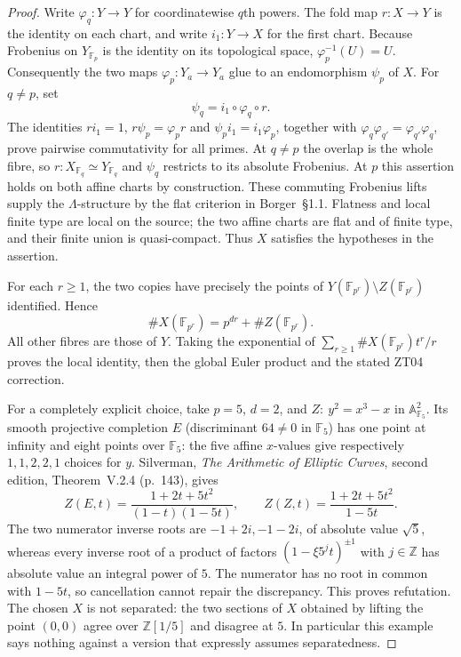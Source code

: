 \begin{proof}
Write $\varphi_q:Y\to Y$ for coordinatewise $q$th powers.  The fold map
$r:X\to Y$ is the identity on each chart, and write $i_1:Y\to X$ for the
first chart.  Because Frobenius on $Y_{\mathbb F_p}$ is the identity on
its topological space, $\varphi_p^{-1}(U)=U$.  Consequently the two
maps $\varphi_p:Y_a\to Y_a$ glue to an endomorphism $\psi_p$ of $X$.
For $q\ne p$, set
\[
 \psi_q=i_1\circ\varphi_q\circ r.
\]
The identities $r i_1=1$, $r\psi_p=\varphi_p r$ and
$\psi_p i_1=i_1\varphi_p$, together with
$\varphi_q\varphi_{q'}=\varphi_{q'}\varphi_q$, prove pairwise
commutativity for all primes.  At $q\ne p$ the overlap is the whole
fibre, so $r:X_{\mathbb F_q}\simeq Y_{\mathbb F_q}$ and $\psi_q$
restricts to its absolute Frobenius.  At $p$ this assertion holds on
both affine charts by construction.  These commuting Frobenius lifts
supply the $\Lambda$-structure by the flat criterion in Borger~\S1.1.
Flatness and local finite type are local on the source; the two affine
charts are flat and of finite type, and their finite union is
quasi-compact.  Thus $X$ satisfies the hypotheses in the assertion.

For each $r\geq1$, the two copies have precisely the points of
$Y(\mathbb F_{p^r})\setminus Z(\mathbb F_{p^r})$ identified.  Hence
\[
 \#X(\mathbb F_{p^r})=p^{dr}+\#Z(\mathbb F_{p^r}).
\]
All other fibres are those of $Y$.  Taking the exponential of
$\sum_{r\geq1}\#X(\mathbb F_{p^r})t^r/r$ proves the local identity,
then the global Euler product and the stated ZT04 correction.

For a completely explicit choice, take $p=5$, $d=2$, and
$Z:\ y^2=x^3-x$ in $\mathbb A^2_{\mathbb F_5}$.  Its smooth projective
completion $E$ (discriminant $64\ne0$ in $\mathbb F_5$) has one
point at infinity and eight points over $\mathbb F_5$: the five affine $x$-values give respectively
$1,1,2,2,1$ choices for $y$.  Silverman, \emph{The Arithmetic of Elliptic Curves}, second edition,
Theorem~V.2.4 (p.~143), gives
\[
 Z(E,t)=\frac{1+2t+5t^2}{(1-t)(1-5t)},\qquad
 Z(Z,t)=\frac{1+2t+5t^2}{1-5t}.
\]
The two numerator inverse roots are $-1+2i,-1-2i$, of absolute value
$\sqrt5$, whereas every inverse root of a product of factors
$(1-\xi5^jt)^{\pm1}$ with $j\in\mathbb Z$ has absolute value an
integral power of $5$.  The numerator has no root in common with
$1-5t$, so cancellation cannot repair the discrepancy.  This proves
refutation.  The chosen $X$ is not separated: the two sections of $X$
obtained by lifting the point $(0,0)$ agree over $\mathbb Z[1/5]$ and
disagree at $5$.  In particular this example says nothing against a
version that expressly assumes separatedness.
\end{proof}

